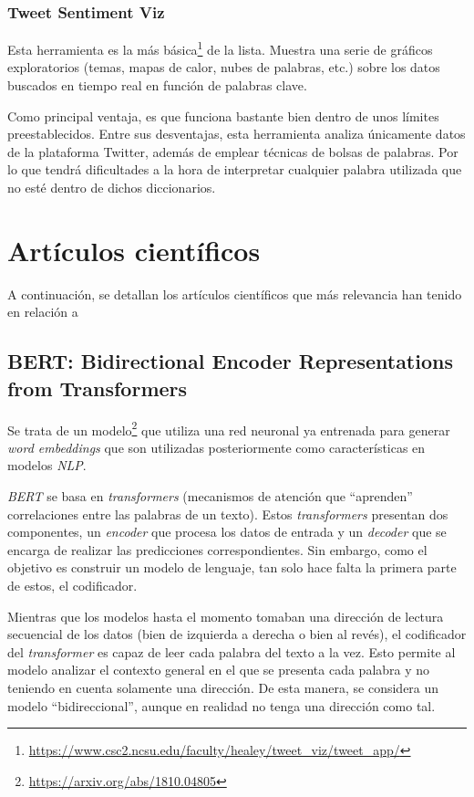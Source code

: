 \subsubsection{Tweet Sentiment Viz}

Esta herramienta es la más básica\footnote{\url{https://www.csc2.ncsu.edu/faculty/healey/tweet_viz/tweet_app/}} de la lista. Muestra una serie de gráficos exploratorios (temas, mapas de calor, nubes de palabras, etc.) sobre los datos buscados en tiempo real en función de palabras clave.

Como principal ventaja, es que funciona bastante bien dentro de unos límites preestablecidos. Entre sus desventajas, esta herramienta analiza únicamente datos de la plataforma Twitter, además de emplear técnicas de bolsas de palabras. Por lo que tendrá dificultades a la hora de interpretar cualquier palabra utilizada que no esté dentro de dichos diccionarios.

\section{Artículos científicos}

A continuación, se detallan los artículos científicos que más relevancia han tenido en relación a 

\subsection{BERT: Bidirectional Encoder Representations from Transformers}

Se trata de un modelo\footnote{\url{https://arxiv.org/abs/1810.04805}} que utiliza una red neuronal ya entrenada para generar \textit{word embeddings} que son utilizadas posteriormente como características en modelos \textit{NLP}.

\textit{BERT} se basa en \textit{transformers} (mecanismos de atención que ``aprenden'' correlaciones entre las palabras de un texto). Estos \textit{transformers} presentan dos componentes, un \textit{encoder} que procesa los datos de entrada y un \textit{decoder} que se encarga de realizar las predicciones correspondientes. Sin embargo, como el objetivo es construir un modelo de lenguaje, tan solo hace falta la primera parte de estos, el codificador.

Mientras que los modelos hasta el momento tomaban una dirección de lectura secuencial de los datos (bien de izquierda a derecha o bien al revés), el codificador del \textit{transformer} es capaz de leer cada palabra del texto a la vez. Esto permite al modelo analizar el contexto general en el que se presenta cada palabra y no teniendo en cuenta solamente una dirección. De esta manera, se considera un modelo ``bidireccional'', aunque en realidad no tenga una dirección como tal.


